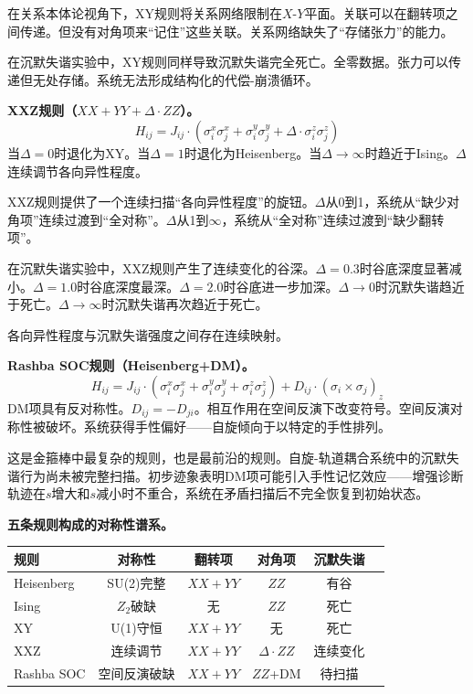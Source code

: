 \documentclass[11pt,a4paper]{book}
\theoremstyle{definition}
\begin{document}
在关系本体论视角下，XY规则将关系网络限制在$X$-$Y$平面。关联可以在翻转项之间传递。但没有对角项来“记住”这些关联。关系网络缺失了“存储张力”的能力。

在沉默失谐实验中，XY规则同样导致沉默失谐完全死亡。全零数据。张力可以传递但无处存储。系统无法形成结构化的代偿-崩溃循环。

\textbf{XXZ规则（$XX+YY+\Delta\cdot ZZ$）。}
\begin{equation}
H_{ij} = J_{ij} \cdot (\sigma_i^x \sigma_j^x + \sigma_i^y \sigma_j^y + \Delta \cdot \sigma_i^z \sigma_j^z)
\end{equation}
当$\Delta=0$时退化为XY。当$\Delta=1$时退化为Heisenberg。当$\Delta\to\infty$时趋近于Ising。$\Delta$连续调节各向异性程度。

XXZ规则提供了一个连续扫描“各向异性程度”的旋钮。$\Delta$从0到1，系统从“缺少对角项”连续过渡到“全对称”。$\Delta$从1到$\infty$，系统从“全对称”连续过渡到“缺少翻转项”。

在沉默失谐实验中，XXZ规则产生了连续变化的谷深。$\Delta=0.3$时谷底深度显著减小。$\Delta=1.0$时谷底深度最深。$\Delta=2.0$时谷底进一步加深。$\Delta\to0$时沉默失谐趋近于死亡。$\Delta\to\infty$时沉默失谐再次趋近于死亡。

各向异性程度与沉默失谐强度之间存在连续映射。

\textbf{Rashba SOC规则（Heisenberg+DM）。}
\begin{equation}
H_{ij} = J_{ij} \cdot (\sigma_i^x \sigma_j^x + \sigma_i^y \sigma_j^y + \sigma_i^z \sigma_j^z) + D_{ij} \cdot (\sigma_i \times \sigma_j)_z
\end{equation}
DM项具有反对称性。$D_{ij} = -D_{ji}$。相互作用在空间反演下改变符号。空间反演对称性被破坏。系统获得手性偏好——自旋倾向于以特定的手性排列。

这是金箍棒中最复杂的规则，也是最前沿的规则。自旋-轨道耦合系统中的沉默失谐行为尚未被完整扫描。初步迹象表明DM项可能引入手性记忆效应——增强诊断轨迹在$s$增大和$s$减小时不重合，系统在矛盾扫描后不完全恢复到初始状态。

\textbf{五条规则构成的对称性谱系。}

\begin{table}[h]
\centering
\begin{tabular}{lccccc}
\toprule
规则 & 对称性 & 翻转项 & 对角项 & 沉默失谐 \\
\midrule
Heisenberg & SU(2)完整 & $XX+YY$ & $ZZ$ & 有谷 \\
Ising & $Z_2$破缺 & 无 & $ZZ$ & 死亡 \\
XY & U(1)守恒 & $XX+YY$ & 无 & 死亡 \\
XXZ & 连续调节 & $XX+YY$ & $\Delta\cdot ZZ$ & 连续变化 \\
Rashba SOC & 空间反演破缺 & $XX+YY$ & $ZZ$+DM & 待扫描 \\
\bottomrule
\end{tabular}
\end{table}
\end{document}
